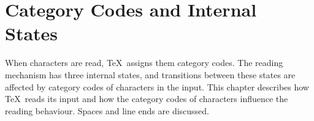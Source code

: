 \documentclass{book}
\begin{document}
\chapter{Category Codes and Internal States}\label{mouth}

When characters are read, 
\TeX\ assigns them
category codes. The reading mechanism has three internal
states, and transitions between these states are affected
by category codes of characters in the input.
This chapter describes how \TeX\ reads its input and
how the category codes of characters influence the
reading behaviour. Spaces and line ends are discussed.
\end{document}
